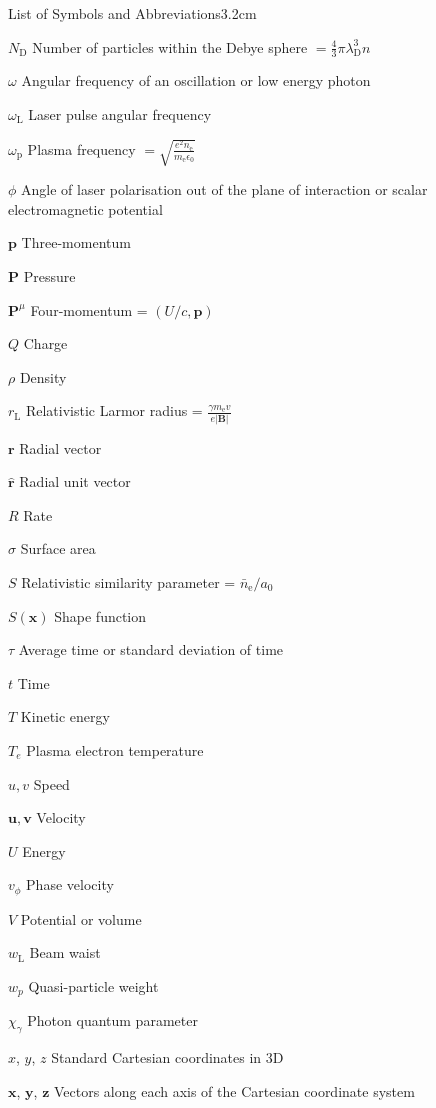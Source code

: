 \begin{mclistof}{List of Symbols and Abbreviations}{3.2cm}
\item[$N_\mathrm{D}$] Number of particles within the Debye sphere $= \frac{4}{3}\pi \lambda^3_\mathrm{D}n$
\item[$\omega$] Angular frequency of an oscillation or low energy photon
\item[$\omega_\mathrm{L}$] Laser pulse angular frequency
\item[$\omega_\mathrm{p}$] Plasma frequency $= \sqrt{\frac{e^2n_\mathrm{e}}{m_\mathrm{e}\epsilon_0}}$
\item[$\phi$] Angle of laser polarisation out of the plane of interaction or scalar electromagnetic potential
\item[$\mathbf{p}$] Three-momentum
\item[$\mathbf{P}$] Pressure
\item[$\mathbf{P}^\mu$] Four-momentum = $(U/c, \mathbf{p})$
\item[$Q$] Charge
\item[$\rho$] Density
\item[$r_\mathrm{L}$] Relativistic Larmor radius  = $\frac{\gamma m_\mathrm{e} v}{e|\mathbf{B}|}$
\item[$\mathbf{r}$] Radial vector
\item[$\hat{\mathbf{r}}$] Radial unit vector
\item[$R$] Rate
\item[$\sigma$] Surface area
\item[$S$] Relativistic similarity parameter = $\bar{n}_\mathrm{e}/a_0$
\item[$S(\mathbf{x})$] Shape function
\item[$\tau$] Average time or standard deviation of time
\item[$t$] Time
\item[$T$] Kinetic energy
\item[$T_e$] Plasma electron temperature
\item[$u,v$] Speed
\item[$\mathbf{u},\mathbf{v}$] Velocity
\item[$U$] Energy
\item[$v_\phi$] Phase velocity
\item[$V$] Potential or volume
\item[$w_\mathrm{L}$] Beam waist
\item[$w_p$] Quasi-particle weight
\item[$\chi_\gamma$] Photon quantum parameter
\item[$x$, $y$, $z$] Standard Cartesian coordinates in 3D
\item[$\mathbf{x}$, $\mathbf{y}$, $\mathbf{z}$] Vectors along each axis of the Cartesian coordinate system

\end{mclistof}
